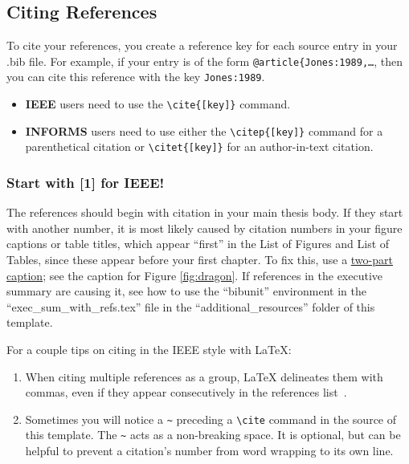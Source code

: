 \subsection{Citing References}
To cite your references, you create a reference key for each source entry in your .bib file.  For example, if your \BibTeX{} entry is of the form {\tt @article\{Jones:1989,\dots}, then you can cite this reference with the key {\tt Jones:1989}.
\begin{itemize}
    \item \textbf{IEEE} users need to use the \verb|\cite{[key]}| command.
    \item \textbf{INFORMS} users need to use either the \verb|\citep{[key]}| command for a parenthetical citation or \verb|\citet{[key]}| for an author-in-text citation.
\end{itemize}

\ifinforms
\else
\let\citep\cite
\let\citet\cite
\fi

\subsubsection{Start with [1] for IEEE!}\label{sec:firstone}
The references should begin with citation \citep{pollan_2006} in your main thesis body. If they start with another number, it is most likely caused by citation numbers in your figure captions or table titles, which appear ``first'' in the List of Figures and List of Tables, since these appear before your first chapter. To fix this, use a \underline{two-part caption}; see the caption for Figure \ref{fig:dragon}. If references in the executive summary are causing it, see how to use the ``bibunit'' environment in the ``exec\_sum\_with\_refs.tex'' file in the ``additional\_resources'' folder of this template.

For a couple tips on citing in the IEEE style with \LaTeX{}:
\begin{enumerate}
    \item When citing multiple references as a group, \LaTeX{} delineates them with commas, even if they appear consecutively in the references list~\cite{pollan_2006,Crabtree:Chaplin:2013,DOD.8570.01-M}.
    \item Sometimes you will notice a \verb|~| preceding a \verb|\cite| command in the source of this template.  The \verb|~| acts as a non-breaking space.  It is optional, but can be helpful to prevent a citation's number from word wrapping to its own line.
\end{enumerate}

